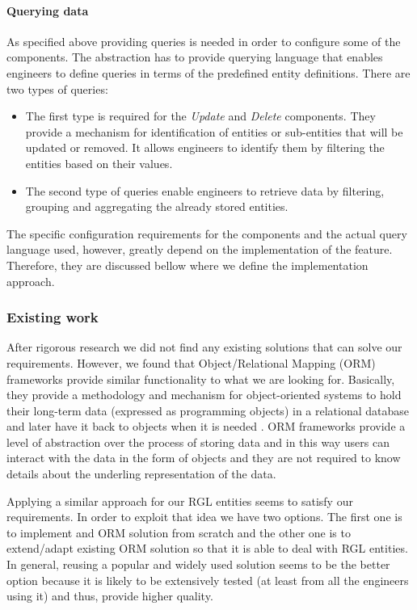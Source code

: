 \paragraph{Querying data}

As specified above providing queries is needed in order to configure some of the components. The abstraction has to provide querying language that enables engineers to define queries in terms of the predefined entity definitions. There are two types of queries:

\begin{itemize}
	\item The first type is required for the \textit{Update} and \textit{Delete} components. They provide a mechanism for identification of entities or sub-entities that will be updated or removed. It allows engineers to identify them by filtering the entities based on their values.
	
	\item The second type of queries enable engineers to retrieve data by filtering, grouping and aggregating the already stored entities.
\end{itemize}

The specific configuration requirements for the components and the actual query language used, however, greatly depend on the implementation of the feature. Therefore, they are discussed bellow where we define the implementation approach.

\subsubsection{Existing work}

After rigorous research we did not find any existing solutions that can solve our requirements. However, we found that Object/Relational Mapping (ORM) frameworks provide similar functionality to what we are looking for. Basically, they provide a methodology and mechanism for object-oriented systems to hold their long-term data (expressed as programming objects) in a relational database and later have it back to objects when it is needed \cite{o2008object}. ORM frameworks provide a level of abstraction over the process of storing data and in this way users can interact with the data in the form of objects and they are not required to know details about the underling representation of the data. 

Applying a similar approach for our RGL entities seems to satisfy our requirements. In order to exploit that idea we have two options. The first one is to implement and ORM solution from scratch and the other one is to extend/adapt existing ORM solution so that it is able to deal with RGL entities. In general, reusing a popular and widely used solution seems to be the better option because it is likely to be extensively tested (at least from all the engineers using it) and thus, provide higher quality. 

